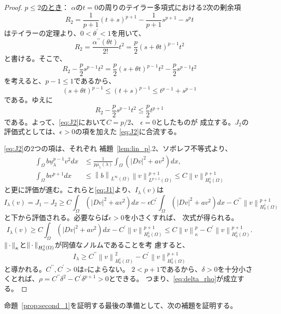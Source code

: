 \begin{proof}
 \underline{{$p \leq 2$}のとき}：
 $\alpha$の$t = 0$の周りのテイラー多項式における$2$次の剰余項
 \[
  R_2 = \frac{1}{p+1} (t+s)^{p+1} - \frac{1}{p+1} s^{p+1} -s^p t
 \]
 はテイラーの定理より、$0 < \theta^\prime < 1$を用いて、
 \[
  R_2 = \frac{\alpha^{\prime\prime}(\theta t)}{2!} t^2 = \frac{p}{2}(s
 + \theta t)^{p-1} t^2
 \]
 と書ける。そこで、
 \[
  R_2 - \frac{p}{2}s^{p-1} t^2 = \frac{p}{2}(s
 + \theta t)^{p-1} t^2 - \frac{p}{2}s^{p-1} t^2
 \]
 を考えると、$p - 1 \leq 1$であるから、
 \[
  (s + \theta t)^{p-1} \leq (t+ s)^{p-1} \leq t^{p-1} + s^{p-1}
 \]
 である。ゆえに
 \[
  R_2 - \frac{p}{2}s^{p-1} t^2 \leq \frac{p}{2} t^{p+1}
 \]
 である。よって、\eqref{eq:J2}において$C = p/2$、
 $\epsilon = 0$としたものが
 成立する。$J_2$の評価式としては、$\epsilon > 0$の項を加えた
 \eqref{eq:J2}に合流する。

 \eqref{eq:J2}の$2$つの項は、それぞれ
 補題~\ref{lem:lin_p}.2、ソボレフ不等式より、
 \begin{align*}
  \int_\Omega b\underline{u}_\lambda^{p-1} v^2 dx &\leq
  \frac{1}{p\mu_1(\lambda)} \int_\Omega \left( \lvert Dv \rvert^2 +
  av^2 \right) dx, \\
  \int_\Omega bv^{p+1} dx &\leq \left\| b \right\|_{L^\infty(\Omega)}
  \left\| v \right\|_{L^{p+1}(\Omega)}^{p+1} \leq C \left\| v
  \right\|_{H_0^1(\Omega)}^{p+1}
 \end{align*}
 と更に評価が進む。これらと\eqref{eq:J1}より、$I_\lambda(v)$は
 \[
  I_\lambda(v) = J_1 - J_2 \geq C \int_\Omega \left( \lvert Dv
 \rvert^2 + a v^2 \right) dx - \epsilon C^\prime \int_\Omega \left(
 \lvert Dv \rvert^2 + av^2 \right) dx - C^{\prime\prime} \left\| v \right\|^{p+1}_{H_0^1(\Omega)}
 \]
 と下から評価される。必要ならば$\epsilon > 0$を小さくすれば、
 次式が得られる。
 \[
  I_\lambda (v) \geq C \int_\Omega \left( \lvert Dv \rvert^2 + av^2
 \right) dx - C^\prime \left\| v \right\|_{H_0^1(\Omega)}^{p+1} \leq C
 \left\| v \right\|_{\kappa}^p - C^\prime \left\| v
 \right\|^{p+1}_{H_0^1(\Omega)}.
 \]
 $\left\|\, \cdot \, \right\|_\kappa$と$\left\|\, \cdot \, \right\|_{H_0^1(\Omega)}$が同値なノルムであることを考
 慮すると、
 \[
  I_\lambda \geq C^{\prime\prime} \left\| v \right\|_{H_0^1(\Omega)}^2
 - C^{\prime} \left\| v \right\|_{H_0^1(\Omega)}^{p+1}
 \]
 と導かれる。$C^{\prime\prime}, C^\prime > 0$は$v$によらない。
 $2 < p+1$であるから、$\delta > 0$を十分小さくとれば、$\rho =
 C^{\prime\prime} \delta^2 - C^{\prime} \delta^{p+1} > 0$とできる。
 つまり、\eqref{eq:delta_rho}が成立する。 \qedhere
\end{proof}

命題~\ref{prop:second_1}を証明する最後の準備として、次の補題を証明する。


